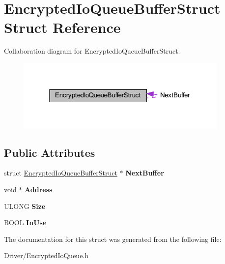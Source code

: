 \hypertarget{struct_encrypted_io_queue_buffer_struct}{}\section{Encrypted\+Io\+Queue\+Buffer\+Struct Struct Reference}
\label{struct_encrypted_io_queue_buffer_struct}


Collaboration diagram for Encrypted\+Io\+Queue\+Buffer\+Struct\+:
\nopagebreak
\begin{figure}[H]
\begin{center}
\leavevmode
\includegraphics[width=295pt]{struct_encrypted_io_queue_buffer_struct__coll__graph}
\end{center}
\end{figure}
\subsection*{Public Attributes}
\begin{DoxyCompactItemize}
\item 
\mbox{\label{struct_encrypted_io_queue_buffer_struct_a95e4bf77a80cd572944b2be2601cfdf9}} 
struct \hyperlink{struct_encrypted_io_queue_buffer_struct}{Encrypted\+Io\+Queue\+Buffer\+Struct} $\ast$ {\bfseries Next\+Buffer}
\item 
\mbox{\label{struct_encrypted_io_queue_buffer_struct_a0625210ef338e7c8dbf97ee7f2259f82}} 
void $\ast$ {\bfseries Address}
\item 
\mbox{\label{struct_encrypted_io_queue_buffer_struct_ac553bfa9780e159eca8e125fa5e80139}} 
U\+L\+O\+NG {\bfseries Size}
\item 
\mbox{\label{struct_encrypted_io_queue_buffer_struct_aa33871b3cc46173a59a5710c2ec0a94a}} 
B\+O\+OL {\bfseries In\+Use}
\end{DoxyCompactItemize}


The documentation for this struct was generated from the following file\+:\begin{DoxyCompactItemize}
\item 
Driver/Encrypted\+Io\+Queue.\+h\end{DoxyCompactItemize}

